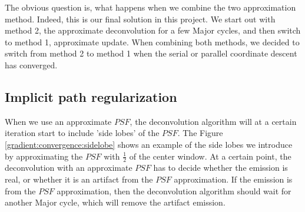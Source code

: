 The obvious question is, what happens when we combine the two approximation method. Indeed, this is our final solution in this project. We start out with method 2, the approximate deconvolution for a few Major cycles, and then switch to method 1, approximate update. When combining both methods, we decided to switch from method 2 to method 1 when the serial or parallel coordinate descent has converged.


\subsection{Implicit path regularization}\label{gradients:pathreg}
When we use an approximate $PSF$, the deconvolution algorithm will at a certain iteration start to include 'side lobes' of the $PSF$. The Figure \ref{gradient:convergence:sidelobe} shows an example of the side lobes we introduce by approximating the $PSF$ with $\frac{1}{2}$ of the center window. At a certain point, the deconvolution with an approximate $PSF$ has to decide whether the emission is real, or whether it is an artifact from the $PSF$ approximation. If the emission is from the $PSF$ approximation, then the deconvolution algorithm should wait for another Major cycle, which will remove the artifact emission.


